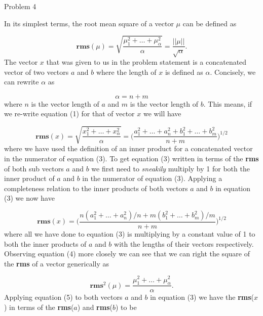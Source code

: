 \begin{problem}{Problem 4}
\begin{highlight}
        In its simplest terms, the root mean square of a vector $\mu$ can be defined as 

        \setcounter{equation}{0}
        \begin{equation}
            \mathbf{rms}(\mu) = \sqrt{\frac{\mu^{2}_{1} + \dots + \mu^{2}_{\alpha}}{\alpha}} = \frac{||\mu||}{\sqrt{\alpha}}.
        \end{equation}
        The vector $x$ that was given to us in the problem statement is a concatenated vector of two vectors $a$ and $b$ where the length of $x$ is defined as $\alpha$. Concisely, we can rewrite $\alpha$
        as 

        \begin{equation}
            \alpha = n + m
        \end{equation}
        where $n$ is the vector length of $a$ and $m$ is the vector length of $b$. This means, if we re-write equation (1) for that of vector $x$ we will have

        \begin{equation}
            \mathbf{rms}(x) = \sqrt{\frac{x^{2}_{1} + \dots + x^{2}_{\alpha}}{\alpha}} = \Bigg(\frac{a^{2}_{1} + \dots + a^{2}_{n} + b^{2}_{1} + \dots + b^{2}_{m}}{n + m} \Bigg)^{1/2}
        \end{equation}
        where we have used the definition of an inner product for a concatenated vector in the numerator of equation (3). To get equation (3) written in terms of the \textbf{rms} of both sub vectors $a$ and
        $b$ we first need to \textit{sneakily} multiply by 1 for both the inner product of $a$ and $b$ in the numerator of equation (3). Applying a completeness relation to the inner products of both vectors $a$
        and $b$ in equation (3) we now have

        \begin{equation}
            \mathbf{rms}(x) = \Bigg(\frac{n(a^{2}_{1} + \dots + a^{2}_{n})/n + m(b^{2}_{1} + \dots + b^{2}_{m})/m}{n + m} \Bigg)^{1/2}
        \end{equation}
        where all we have done to equation (3) is multiplying by a constant value of 1 to both the inner products of $a$ and $b$ with the lengths of their vectors respectively. Observing equation (4) more closely
        we can see that we can right the square of the \textbf{rms} of a vector generically as

        \begin{equation}
            \mathbf{rms}^{2}(\mu) = \frac{\mu^{2}_{1} + \dots + \mu^{2}_{\alpha}}{\alpha}.
        \end{equation}
        Applying equation (5) to both vectors $a$ and $b$ in equation (3) we have the \textbf{rms}($x$) in terms of the \textbf{rms}($a$) and \textbf{rms}($b$) to be


\end{highlight}
\end{problem}
